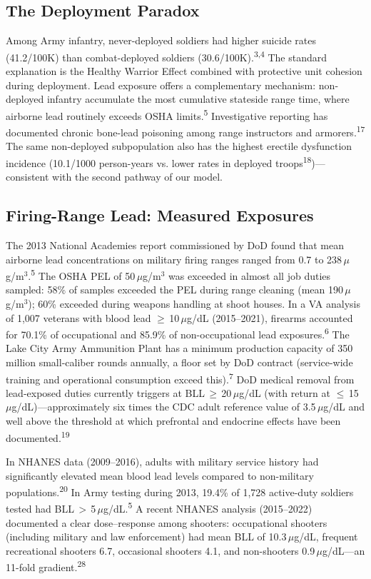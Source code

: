 \documentclass[11pt,twocolumn]{article}
\begin{document}
\subsection{The Deployment Paradox}

Among Army infantry, never-deployed soldiers had higher suicide rates (41.2/100K) than combat-deployed soldiers (30.6/100K).\textsuperscript{3,4} The standard explanation is the Healthy Warrior Effect combined with protective unit cohesion during deployment. Lead exposure offers a complementary mechanism: non-deployed infantry accumulate the most cumulative stateside range time, where airborne lead routinely exceeds OSHA limits.\textsuperscript{5} Investigative reporting has documented chronic bone-lead poisoning among range instructors and armorers.\textsuperscript{17} The same non-deployed subpopulation also has the highest erectile dysfunction incidence (10.1/1000 person-years vs. lower rates in deployed troops\textsuperscript{18})---consistent with the second pathway of our model.


\subsection{Firing-Range Lead: Measured Exposures}

The 2013 National Academies report commissioned by DoD found that mean airborne lead concentrations on military firing ranges ranged from 0.7 to 238\,$\mu$g/m$^3$.\textsuperscript{5} The OSHA PEL of 50\,$\mu$g/m$^3$ was exceeded in almost all job duties sampled: 58\% of samples exceeded the PEL during range cleaning (mean 190\,$\mu$g/m$^3$); 60\% exceeded during weapons handling at shoot houses. In a VA analysis of 1,007 veterans with blood lead $\geq$\,10\,$\mu$g/dL (2015--2021), firearms accounted for 70.1\% of occupational and 85.9\% of non-occupational lead exposures.\textsuperscript{6} The Lake City Army Ammunition Plant has a minimum production capacity of 350 million small-caliber rounds annually, a floor set by DoD contract (service-wide training and operational consumption exceed this).\textsuperscript{7} DoD medical removal from lead-exposed duties currently triggers at BLL\,$\geq$\,20\,$\mu$g/dL (with return at $\leq$\,15\,$\mu$g/dL)---approximately six times the CDC adult reference value of 3.5\,$\mu$g/dL and well above the threshold at which prefrontal and endocrine effects have been documented.\textsuperscript{19}

In NHANES data (2009--2016), adults with military service history had significantly elevated mean blood lead levels compared to non-military populations.\textsuperscript{20} In Army testing during 2013, 19.4\% of 1,728 active-duty soldiers tested had BLL\,$>$\,5\,$\mu$g/dL.\textsuperscript{5} A recent NHANES analysis (2015--2022) documented a clear dose--response among shooters: occupational shooters (including military and law enforcement) had mean BLL of 10.3\,$\mu$g/dL, frequent recreational shooters 6.7, occasional shooters 4.1, and non-shooters 0.9\,$\mu$g/dL---an 11-fold gradient.\textsuperscript{28}
\end{document}
